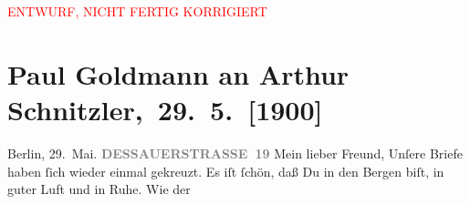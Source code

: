 
\begin{center}
            \textcolor{red}{ENTWURF, NICHT FERTIG KORRIGIERT}
                      \end{center}
            
         
         \newcommand{\erwaehntePersonen}{Personen: Richard Beer-Hofmann, Otto Brahm, Erich Freund, Clementine Goldmann, Paul Schlenther}
         \newcommand{\erwaehnteInstitutionen}{Institutionen: Burgtheater, Freie literarische Vereinigung zu Breslau}
         \newcommand{\erwaehnteOrte}{Orte: Alpen, Aussichtsturm Merkur, Berlin, Breslau, Dessauer Straße, Dänemark, Kopenhagen, Puchberg am Schneeberg, Schneeberg}
         \newcommand{\erwaehnteWerke}{Werke: Der Schleier der Beatrice. Schauspiel in fünf Akten}
               \section[ Paul Goldmann an Arthur Schnitzler, 29. 5. {[}1900{]}]{ Paul Goldmann an Arthur Schnitzler, 29. 5. {[}1900{]}}\nopagebreak{}\rehead{ }\begin{ledgroupsized}[t]{13cm}\normalsize\beginnumbering \toendnotes[C]{\smallbreak\pagebreak[2]} 
\toendnotes[C]{\smallbreak}\pstart
           \raggedleft{}{\pb}Berlin, 29. Mai.\pend
           \pstart
           \textcolor{gray}{\textbf{DESSAUERSTRASSE 19}}\pend
           \pstart\center{}Mein lieber Freund,\pend\pstart
           Unſere Briefe haben ſich wieder einmal gekreuzt. Es iſt ſchön, daß Du in den Bergen biſt, in guter Luft und
               in Ruhe. Wie der \label{K_L02917-2v}
\end{ledgroupsized}
